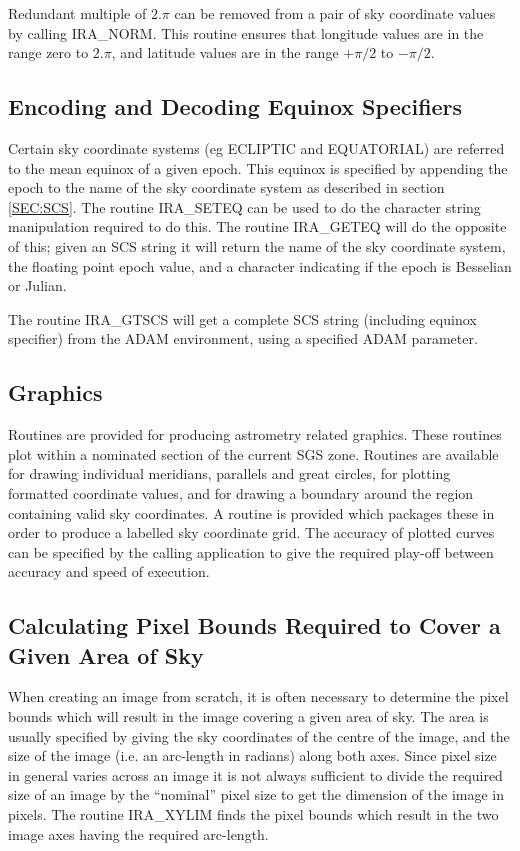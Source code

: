 Redundant multiple of $2.\pi$ can be removed from a pair of sky coordinate
values by calling IRA\_NORM. This routine ensures that longitude values are in
the range zero to $2.\pi$, and latitude values are in the range $+\pi/2$ to
$-\pi/2$.

\subsection {Encoding and Decoding Equinox Specifiers}
Certain sky coordinate systems (eg ECLIPTIC and EQUATORIAL) are referred to the
mean equinox of a given epoch. This equinox is specified by appending the epoch
to the name of the sky coordinate system as described in section \ref {SEC:SCS}.
The routine IRA\_SETEQ can be used to do the character string manipulation
required to do this. The routine IRA\_GETEQ will do the opposite of this; given
an SCS string it will return the name of the sky coordinate system, the floating
point epoch value, and a character indicating if the epoch is Besselian or
Julian.

The routine IRA\_GTSCS will get a complete SCS string (including equinox
specifier) from the ADAM environment, using a specified ADAM parameter.

\subsection {Graphics}
Routines are provided for producing astrometry related graphics. These routines
plot within a nominated section of the current SGS zone. Routines are available
for drawing individual meridians, parallels and great circles, for plotting
formatted coordinate values, and for drawing a boundary around the region
containing valid sky coordinates. A routine is provided which packages these in
order to produce a labelled sky coordinate grid. The accuracy of plotted curves
can be specified by the calling application to give the required play-off
between accuracy and speed of execution.

\subsection {Calculating Pixel Bounds Required to Cover a Given Area of Sky}
When creating an image from scratch, it is often necessary to determine the
pixel bounds which will result in the image covering a given area of sky. The
area is usually specified by giving the sky coordinates of the centre of the
image, and the size of the image (i.e. an arc-length in radians) along both
axes. Since pixel size in general varies across an image it is not always
sufficient to divide the required size of an image by the ``nominal'' pixel size
to get the dimension of the image in pixels. The routine IRA\_XYLIM finds the
pixel bounds which result in the two image axes having the required arc-length.

